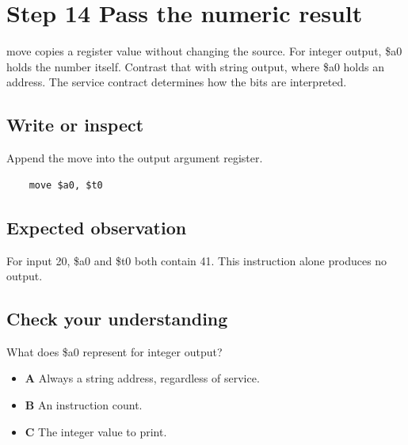 \section{Step 14 Pass the numeric
  result}\label{001-console-calculation-s14-step-14-pass-the-numeric-result}

move copies a register value without changing the source. For integer
output, \$a0 holds the number itself. Contrast that with string output,
where \$a0 holds an address. The service contract determines how the
bits are interpreted.

\subsection{Write or
  inspect}\label{001-console-calculation-s14-write-or-inspect}

Append the move into the output argument register.

\begin{verbatim}
    move $a0, $t0
\end{verbatim}

\subsection{Expected
  observation}\label{001-console-calculation-s14-expected-observation}

For input 20, \$a0 and \$t0 both contain 41. This instruction alone
produces no output.

\subsection{Check your
  understanding}\label{001-console-calculation-s14-check-your-understanding}

What does \$a0 represent for integer output?

\begin{itemize}
  \tightlist
  \item
        \textbf{A} Always a string address, regardless of service.
  \item
        \textbf{B} An instruction count.
  \item
        \textbf{C} The integer value to print.
\end{itemize}
